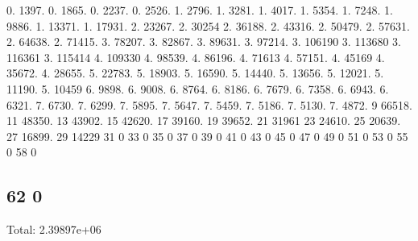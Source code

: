 0. 1397. 0. 1865. 0. 2237. 0. 2526. 1. 2796. 1. 3281. 1. 4017. 1. 5354. 1. 7248. 1. 9886. 1. 13371. 1. 17931. 2. 23267. 2. 30254 2. 36188. 2. 43316. 2. 50479. 2. 57631. 2. 64638. 2. 71415. 3. 78207. 3. 82867. 3. 89631. 3. 97214. 3. 106190 3. 113680 3. 116361 3. 115414 4. 109330 4. 98539. 4. 86196. 4. 71613 4. 57151. 4. 45169 4. 35672. 4. 28655. 5. 22783. 5. 18903. 5. 16590. 5. 14440. 5. 13656. 5. 12021. 5. 11190. 5. 10459 6. 9898. 6. 9008. 6. 8764. 6. 8186. 6. 7679. 6. 7358. 6. 6943. 6. 6321. 7. 6730. 7. 6299. 7. 5895. 7. 5647. 7. 5459. 7. 5186. 7. 5130. 7. 4872. 9 66518. 11 48350. 13 43902. 15 42620. 17 39160. 19 39652. 21 31961 23 24610. 25 20639. 27 16899. 29 14229 31 0 33 0 35 0 37 0 39 0 41 0 43 0 45 0 47 0 49 0 51 0 53 0 55 0 58 0 \subsection*{62 0 }

Total\+: 2.\+39897e+06 